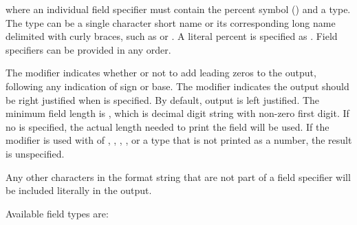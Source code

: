 where an individual field specifier must contain the percent symbol ({\pcode{\%}}) and a type.
The type can be a single character short name or its corresponding long name delimited with curly braces,
 such as {} or {}.
A literal percent is specified as {\pcode{\%\%}}.  Field specifiers can be provided in any order.

The  modifier indicates whether or not to add leading zeros to the output,
following any indication of sign or base.
The  modifier indicates the output should be right justified when  is specified.
By default, output is left justified.
The minimum field length is , which is decimal digit string
with non-zero first digit.
If no  is specified, the actual length needed to print the field will be used.
If the  modifier is used with  of , {},
, {}, or a type that is not printed as a number, the
result is unspecified.

Any other characters in the format string that are not part of a field specifier will be included literally
in the output.

Available field types are:

